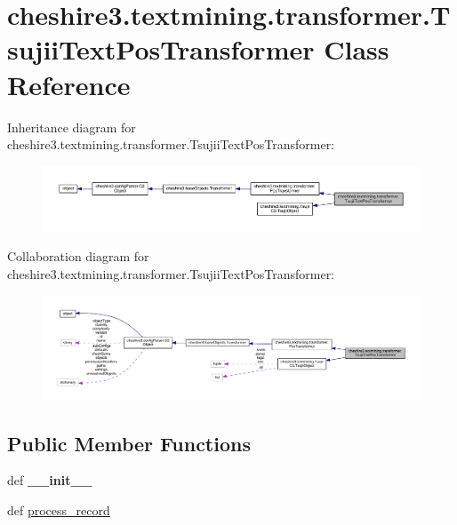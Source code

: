 \hypertarget{classcheshire3_1_1textmining_1_1transformer_1_1_tsujii_text_pos_transformer}{\section{cheshire3.\-textmining.\-transformer.\-Tsujii\-Text\-Pos\-Transformer Class Reference}
\label{classcheshire3_1_1textmining_1_1transformer_1_1_tsujii_text_pos_transformer}
}


Inheritance diagram for cheshire3.\-textmining.\-transformer.\-Tsujii\-Text\-Pos\-Transformer\-:
\nopagebreak
\begin{figure}[H]
\begin{center}
\leavevmode
\includegraphics[width=350pt]{classcheshire3_1_1textmining_1_1transformer_1_1_tsujii_text_pos_transformer__inherit__graph}
\end{center}
\end{figure}


Collaboration diagram for cheshire3.\-textmining.\-transformer.\-Tsujii\-Text\-Pos\-Transformer\-:
\nopagebreak
\begin{figure}[H]
\begin{center}
\leavevmode
\includegraphics[width=350pt]{classcheshire3_1_1textmining_1_1transformer_1_1_tsujii_text_pos_transformer__coll__graph}
\end{center}
\end{figure}
\subsection*{Public Member Functions}
\begin{DoxyCompactItemize}
\item 
\hypertarget{classcheshire3_1_1textmining_1_1transformer_1_1_tsujii_text_pos_transformer_a8905451f497fb6afccceb28c1233167a}{def {\bfseries \-\_\-\-\_\-init\-\_\-\-\_\-}}\label{classcheshire3_1_1textmining_1_1transformer_1_1_tsujii_text_pos_transformer_a8905451f497fb6afccceb28c1233167a}

\item 
def \hyperlink{classcheshire3_1_1textmining_1_1transformer_1_1_tsujii_text_pos_transformer_ae55c9b344eacd931d8585f8b7854aaa9}{process\-\_\-record}
\end{DoxyCompactItemize}
